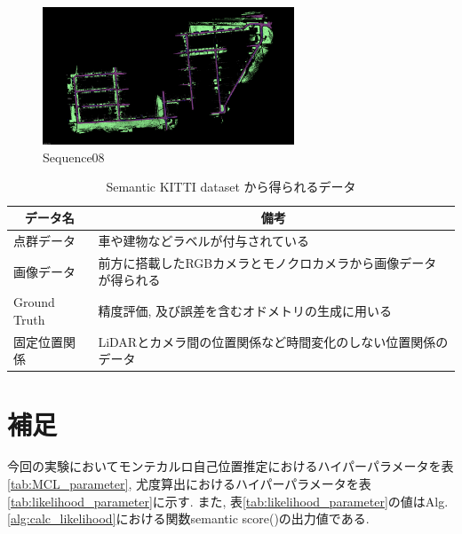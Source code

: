 \begin{figure}[htbp]
\begin{minipage}{0.5\hsize}
  \begin{center}
   \includegraphics[width=75mm]{./picture/sequence08_map.png}
  \end{center}
  \caption{Sequence08}
  \label{fig:sequence08}
 \end{minipage}
\end{figure}

\begin{table}[htbp]
\begin{center}
\caption{Semantic KITTI dataset から得られるデータ}\label{tab:data_from_semantic_kitti}
  \begin{tabular}{l|l} \hline
    \multicolumn{1}{c|}{データ名} & \multicolumn{1}{c}{備考} \\ \hline
    点群データ & 車や建物などラベルが付与されている \\
    画像データ & 前方に搭載したRGBカメラとモノクロカメラから画像データが得られる \\
    Ground Truth & 精度評価, 及び誤差を含むオドメトリの生成に用いる\\
    固定位置関係 & LiDARとカメラ間の位置関係など時間変化のしない位置関係のデータ \\ \hline
  \end{tabular}
\end{center}
\end{table}

\section{補足}\label{sec:env_appendix}
今回の実験においてモンテカルロ自己位置推定におけるハイパーパラメータを表\ref{tab:MCL_parameter}, 尤度算出におけるハイパーパラメータを表\ref{tab:likelihood_parameter}に示す. また, 表\ref{tab:likelihood_parameter}の値はAlg.\ref{alg:calc_likelihood}における関数semantic score()の出力値である.

